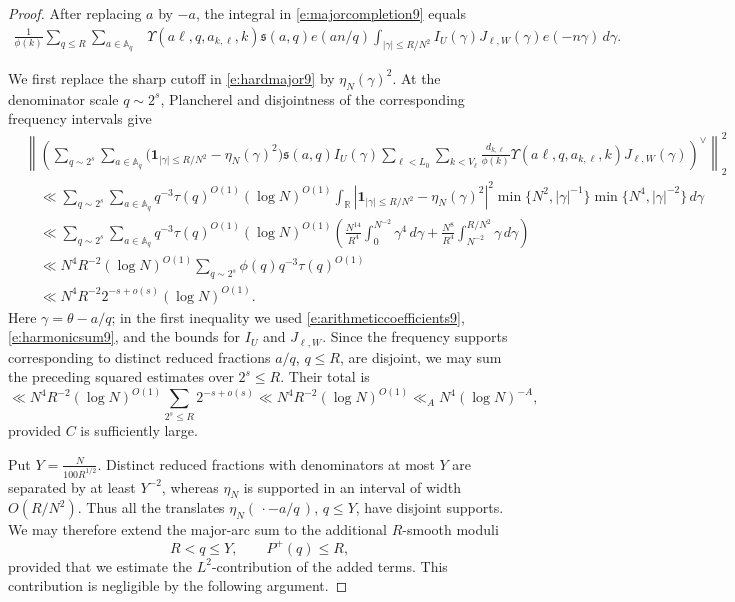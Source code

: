 \documentclass[12pt,reqno]{amsart}
\numberwithin{equation}{section}
\theoremstyle{definition}
\theoremstyle{remark}
\newcommand{\one}{\mathbf{1}}
\begin{document}
\begin{proof}
After replacing \(a\) by \(-a\), the integral in
\eqref{e:majorcompletion9} equals
\begin{align}\label{e:hardmajor9}
 \frac1{\phi(k)}
 \sum_{q\leq R}\sum_{a\in\mathbb A_q}
 &\Upsilon(a\ell,q,a_{k,\ell},k)
 \mathfrak s(a,q)e(an/q)
 \int_{|\gamma|\leq R/N^2}
 I_U(\gamma)J_{\ell,W}(\gamma)e(-n\gamma)\,d\gamma.
\end{align}

We first replace the sharp cutoff in \eqref{e:hardmajor9} by
\(\eta_N(\gamma)^2\).  At the denominator scale
\(q\sim2^s\), Plancherel and disjointness of the corresponding
frequency intervals give
\begin{align*}
 &\left\|
 \left(
 \sum_{q\sim2^s}\sum_{a\in\mathbb A_q}
 \bigl(\one_{|\gamma|\leq R/N^2}-\eta_N(\gamma)^2\bigr)
 \mathfrak s(a,q)I_U(\gamma)
 \sum_{\ell<L_0}\sum_{k<V_\ell}
 \frac{d_{k,\ell}}{\phi(k)}
 \Upsilon(a\ell,q,a_{k,\ell},k)J_{\ell,W}(\gamma)
 \right)^\vee
 \right\|_2^2\\
 &\quad\ll
 \sum_{q\sim2^s}\sum_{a\in\mathbb A_q}
 q^{-3}\tau(q)^{O(1)}(\log N)^{O(1)}
 \int_{\mathbb R}
 \left|\one_{|\gamma|\leq R/N^2}-\eta_N(\gamma)^2\right|^2
 \min\{N^2,|\gamma|^{-1}\}
 \min\{N^4,|\gamma|^{-2}\}\,d\gamma\\
 &\quad\ll
 \sum_{q\sim2^s}\sum_{a\in\mathbb A_q}
 q^{-3}\tau(q)^{O(1)}(\log N)^{O(1)}
 \left(
 \frac{N^{14}}{R^4}\int_0^{N^{-2}}\gamma^4\,d\gamma
 +\frac{N^8}{R^4}\int_{N^{-2}}^{R/N^2}\gamma\,d\gamma
 \right)\\
 &\quad\ll
 N^4R^{-2}(\log N)^{O(1)}
 \sum_{q\sim2^s}\phi(q)q^{-3}\tau(q)^{O(1)}\\
 &\quad\ll
 N^4R^{-2}2^{-s+o(s)}(\log N)^{O(1)}.
\end{align*}
Here \(\gamma=\theta-a/q\); in the first inequality we used
\eqref{e:arithmeticcoefficients9}, \eqref{e:harmonicsum9}, and the
bounds for \(I_U\) and \(J_{\ell,W}\).  Since the frequency supports corresponding to distinct reduced
fractions \(a/q\), \(q\leq R\), are disjoint, we may sum the preceding
squared estimates over \(2^s\leq R\).  Their total is
\[
 \ll
 N^4R^{-2}(\log N)^{O(1)}
 \sum_{2^s\leq R}2^{-s+o(s)}
 \ll
 N^4R^{-2}(\log N)^{O(1)}
 \ll_A N^4(\log N)^{-A},
\]
provided \(C\) is sufficiently large.



Put $ Y=\frac{N}{100R^{1/2}}.$
Distinct reduced fractions with denominators at most \(Y\) are
separated by at least \(Y^{-2}\), whereas \(\eta_N\) is supported in
an interval of width \(O(R/N^2)\).  Thus all the translates
\(\eta_N(\,\cdot-a/q\,)\), \(q\leq Y\), have disjoint supports.
We may therefore extend the major-arc sum to the additional \(R\)-smooth
moduli
\[
 R<q\leq Y,\qquad P^+(q)\leq R,
\]
provided that we estimate the \(L^2\)-contribution of the added terms.
This contribution is negligible by the following argument.


\end{proof}
\end{document}

